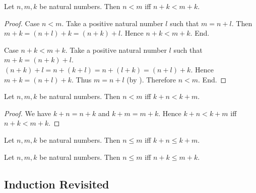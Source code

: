 \documentclass[10pt]{article}
\begin{document}
  \begin{forthel}
    \begin{proposition}
      Let $n, m, k$ be natural numbers.
      Then $n < m$ iff $n + k < m + k$.
    \end{proposition}
    \begin{proof}
      Case $n < m$.
        Take a positive natural number $l$ such that $m = n + l$.
        Then $m + k
          = (n + l) + k
          = (n + k) + l$.
        Hence $n + k < m + k$.
      End.

      Case $n + k < m + k$.
        Take a positive natural number $l$ such that $m + k = (n + k) + l$.
        $(n + k) + l
          = n + (k + l)
          = n + (l + k)
          = (n + l) + k$.
        Hence $m + k = (n + l) + k$.
        Thus $m = n + l$ (by ).
        Therefore $n < m$.
      End.
    \end{proof}
  \end{forthel}

  \begin{forthel}
    \begin{corollary}
      Let $n, m, k$ be natural numbers.
      Then $n < m$ iff $k + n < k + m$.
    \end{corollary}
    \begin{proof}
      We have $k + n = n + k$ and $k + m = m + k$.
      Hence $k + n < k + m$ iff $n + k < m + k$.
    \end{proof}
  \end{forthel}

  \begin{forthel}
    \begin{corollary}
      Let $n, m, k$ be natural numbers.
      Then $n \leq m$ iff $k + n \leq k + m$.
    \end{corollary}
  \end{forthel}

  \begin{forthel}
    \begin{corollary}
      Let $n, m, k$ be natural numbers.
      Then $n \leq m$ iff $n + k \leq m + k$.
    \end{corollary}
  \end{forthel}


  \subsection*{Induction Revisited}
\end{document}
